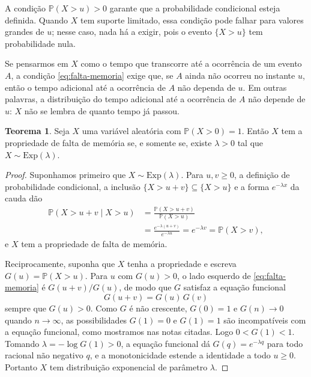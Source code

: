 \documentclass[12pt,portuguese]{article}
\theoremstyle{definition}
\newtheorem{theorem}{Teorema}
\theoremstyle{plainexercise}
\theoremstyle{starredexercise}
\theoremstyle{definition}
\begin{document}
A condição $\mathbb{P}(X>u)>0$ garante que a probabilidade condicional esteja
definida. Quando $X$ tem suporte limitado, essa condição pode falhar para
valores grandes de $u$; nesse caso, nada há a exigir, pois o evento $\{X>u\}$
tem probabilidade nula.

Se pensarmos em $X$ como o tempo que transcorre até a ocorrência de um evento
$A$, a condição \eqref{eq:falta-memoria} exige que, se $A$ ainda não ocorreu no
instante $u$, então o tempo adicional até a ocorrência de $A$ não dependa de
$u$. Em outras palavras, a distribuição do tempo adicional até a ocorrência de
$A$ não depende de $u$: $X$ não se lembra de quanto tempo já passou.

\begin{theorem}\label{thm:falta-memoria-caracteriza}
Seja $X$ uma variável aleatória com $\mathbb{P}(X>0)=1$. Então $X$ tem a
propriedade de falta de memória se, e somente se, existe $\lambda>0$ tal que
$X\sim\mathrm{Exp}(\lambda)$.
\end{theorem}

\begin{proof}
Suponhamos primeiro que $X\sim\mathrm{Exp}(\lambda)$. Para $u,v\geqslant0$, a
definição de probabilidade condicional, a inclusão
$\{X>u+v\}\subseteq\{X>u\}$ e a forma $e^{-\lambda x}$ da cauda dão
\begin{align*}
  \mathbb{P}(X>u+v\mid X>u)
  &=\frac{\mathbb{P}(X>u+v)}{\mathbb{P}(X>u)}
  \\[0.3cm]
  &=\frac{e^{-\lambda(u+v)}}{e^{-\lambda u}}
  =e^{-\lambda v}
  =\mathbb{P}(X>v),
\end{align*}
e $X$ tem a propriedade de falta de memória.

Reciprocamente, suponha que $X$ tenha a propriedade e escreva
$G(u)=\mathbb{P}(X>u)$. Para $u$ com $G(u)>0$, o lado esquerdo de
\eqref{eq:falta-memoria} é $G(u+v)/G(u)$, de modo que $G$ satisfaz a equação
funcional
\begin{equation}\label{eq:equacao-funcional-falta-memoria}
  G(u+v)=G(u)\,G(v)
\end{equation}
sempre que $G(u)>0$. Como $G$ é não crescente, $G(0)=1$ e $G(n)\to0$ quando
$n\to\infty$, as possibilidades $G(1)=0$ e $G(1)=1$ são incompatíveis com a
equação funcional, como mostramos nas notas citadas. Logo
$0<G(1)<1$. Tomando $\lambda=-\log G(1)>0$, a equação funcional dá
$G(q)=e^{-\lambda q}$ para todo racional não negativo $q$, e a monotonicidade
estende a identidade a todo $u\geqslant0$. Portanto $X$ tem distribuição
exponencial de parâmetro $\lambda$.
\end{proof}
\end{document}

